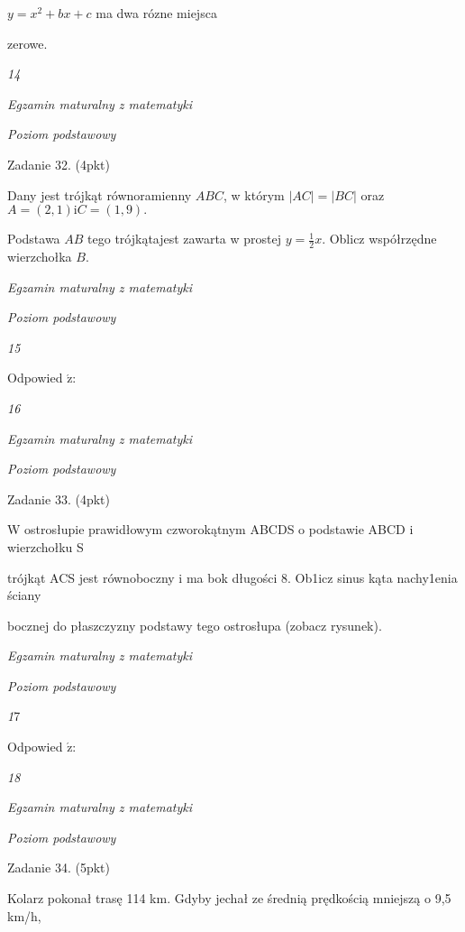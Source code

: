 \documentclass[a4paper,12pt]{article}
\begin{document}
$y=x^{2}+bx+c$ ma dwa rózne miejsca

zerowe.





{\it 14}

{\it Egzamin maturalny z matematyki}

{\it Poziom podstawowy}

Zadanie 32. (4pkt)

Dany jest trójkąt równoramienny $ABC$, w którym $|AC|=|BC|$ oraz $A=(2,1) \mathrm{i} C=(1,9).$

Podstawa $AB$ tego trójkątajest zawarta w prostej $y=\displaystyle \frac{1}{2}x$. Oblicz współrzędne wierzchołka $B.$





{\it Egzamin maturalny z matematyki}

{\it Poziom podstawowy}

{\it 15}

Odpowied $\acute{\mathrm{z}}$:





{\it 16}

{\it Egzamin maturalny z matematyki}

{\it Poziom podstawowy}

Zadanie 33. (4pkt)

W ostrosłupie prawidłowym czworokątnym ABCDS o podstawie ABCD i wierzchołku S

trójkąt ACS jest równoboczny i ma bok długości 8. Ob1icz sinus kąta nachy1enia ściany

bocznej do płaszczyzny podstawy tego ostrosłupa (zobacz rysunek).





{\it Egzamin maturalny z matematyki}

{\it Poziom podstawowy}

{\it 1}7

Odpowied $\acute{\mathrm{z}}$:





{\it 18}

{\it Egzamin maturalny z matematyki}

{\it Poziom podstawowy}

Zadanie 34. (5pkt)

Kolarz pokonał trasę 114 km. Gdyby jechał ze średnią prędkością mniejszą o 9,5 km/h,
\end{document}

